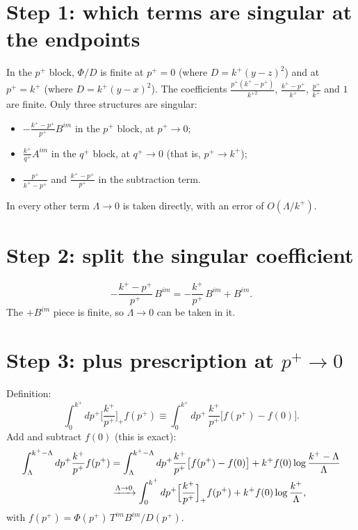 \documentclass[10pt]{article}
\numberwithin{equation}{section}
\begin{document}
\section{Step 1: which terms are singular at the endpoints}
In the $p^{+}$ block, $\Phi/D$ is finite at $p^{+}=0$ (where $D=k^{+}(y-z)^{2}$) and at $p^{+}=k^{+}$ (where $D=k^{+}(y-x)^{2}$). The coefficients $\frac{p^{+}(k^{+}-p^{+})}{k^{+2}}$, $\frac{k^{+}-p^{+}}{k^{+}}$, $\frac{p^{+}}{k^{+}}$ and $1$ are finite. Only three structures are singular:
\begin{itemize}
\item $-\frac{k^{+}-p^{+}}{p^{+}}B^{im}$ in the $p^{+}$ block, at $p^{+}\to0$;
\item $\frac{k^{+}}{q^{+}}A^{im}$ in the $q^{+}$ block, at $q^{+}\to0$ (that is, $p^{+}\to k^{+}$);
\item $\frac{p^{+}}{k^{+}-p^{+}}$ and $\frac{k^{+}-p^{+}}{p^{+}}$ in the subtraction term.
\end{itemize}
In every other term $\Lambda\to0$ is taken directly, with an error of $O(\Lambda/k^{+})$.

\section{Step 2: split the singular coefficient}
\begin{equation}
-\frac{k^{+}-p^{+}}{p^{+}}\,B^{im}=-\frac{k^{+}}{p^{+}}\,B^{im}+B^{im}.
\end{equation}
The $+B^{im}$ piece is finite, so $\Lambda\to0$ can be taken in it.

\section{Step 3: plus prescription at $p^{+}\to0$}
Definition:
\begin{equation}
\int_{0}^{k^{+}}dp^{+}\Big[\frac{k^{+}}{p^{+}}\Big]_{+}f(p^{+})\equiv\int_{0}^{k^{+}}dp^{+}\,\frac{k^{+}}{p^{+}}\big[f(p^{+})-f(0)\big].
\end{equation}
Add and subtract $f(0)$ (this is exact):
\begin{align}
\int_{\Lambda}^{k^{+}-\Lambda}dp^{+}\frac{k^{+}}{p^{+}}f(p^{+})&=\int_{\Lambda}^{k^{+}-\Lambda}dp^{+}\frac{k^{+}}{p^{+}}\big[f(p^{+})-f(0)\big]+k^{+}f(0)\log\frac{k^{+}-\Lambda}{\Lambda}\notag\\
&\xrightarrow{\Lambda\to0}\int_{0}^{k^{+}}dp^{+}\Big[\frac{k^{+}}{p^{+}}\Big]_{+}f(p^{+})+k^{+}f(0)\log\frac{k^{+}}{\Lambda},
\end{align}
with $f(p^{+})=\Phi(p^{+})\,T^{im}B^{im}/D(p^{+})$.
\end{document}
